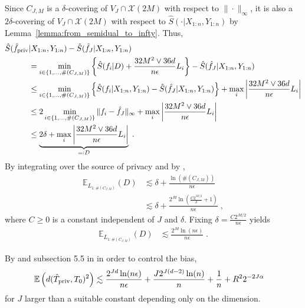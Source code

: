 \documentclass{article}
\theoremstyle{plain}
\theoremstyle{definition}
\theoremstyle{remark}
\newcommand{\E}[0]{\mathbb{E}}
\newcommand{\defeq}{=\vcentcolon}
\newcommand\p[1]{\left( {#1}\right)}
\newcommand\card[1]{\# \left( {#1}\right)}
\begin{document}
Since $C_{J, M}$ is a $\delta$-covering of $V_J \cap \mathcal{X}(2M)$ with respect to $\| \cdot\|_{\infty}$, it is also a $2 \delta$-covering of $V_J \cap \mathcal{X}(2M)$ with respect to $\hat{S}(\cdot | X_{1:n}, Y_{1:n})$ by Lemma~\ref{lemma:from_semidual_to_infty}. 
Thus,
\begin{equation}
    \begin{aligned}
        \hat{S}(\hat{f}_{\text{\normalshape priv}} &| X_{1:n}, Y_{1:n}) - \hat{S}(\hat{f}_{J} | X_{1:n}, Y_{1:n}) \\
        & = \min_{i \in \{1, \dots, \card{C_{J, M}} \}} \left\{\hat{S}(f_i | D) + \frac{32 M^2 \vee 36 d}{n \epsilon} L_i \right\} -
        \hat S(\hat f_J|X_{1:n}, Y_{1:n})\\
        & \leq \min_{i \in \{1, \dots, \card{C_{J, M}} \}} \left\{\hat{S}({f}_{i} | X_{1:n}, Y_{1:n}) - \hat S(\hat f_J|X_{1:n}, Y_{1:n}) \right\} + \max_{i} \left| \frac{32 M^2 \vee 36 d}{n \epsilon} L_i \right|\\
        & \leq 2\min_{i \in \{1, \dots, \card{C_{J, M}} \}} \| f_i - \hat f_J\|_\infty+ \max_{i} \left| \frac{32 M^2 \vee 36 d}{n \epsilon} L_i \right|\\
        &\leq 
        \underbrace{2 \delta + \max_{i} \left| \frac{32 M^2 \vee 36 d}{n \epsilon} L_i \right|}_{\defeq D} \;.
    \end{aligned}
\end{equation}
By integrating over the source of privacy and by ,
\begin{equation}
    \begin{aligned}
        \E_{L_{1:\card{C_{J, M}}}} \p{D}
        &\lesssim 
        \delta + \frac{\ln(\card{C_{J, M}})}{n \epsilon} \\
        &\lesssim 
        \delta + \frac{2^{Jd} \ln \p{\frac{C 2^{J d / 2} }{\delta} + 1}}{n \epsilon} \;,
    \end{aligned}
\end{equation}
where $C\geq 0$ is a constant independent of $J$ and $\delta$. 
Fixing $\delta = \frac{C 2^{J d / 2} }{n \epsilon}$ yields
\begin{equation}
    \begin{aligned}
        \E_{L_{1:\card{C_{J, M}}}} \p{D}
        &\lesssim 
        \frac{2^{Jd} \ln(n \epsilon)}{n \epsilon}  \;.
    \end{aligned}
\end{equation}

By  and subsection 5.5 in \cite{hutter2021minimax} in order to control the bias, 
\begin{equation}
    \begin{aligned}
        \E &\p{d(\hat{T}_{\text{\normalshape priv}}, T_0)^2} 
        \lesssim 
        \frac{2^{Jd} \ln(n \epsilon)}{n \epsilon}  + \frac{J 2^{J (d-2)}\ln(n)}{n}+ \frac{1}{n} + R^2 2^{-2 J \alpha}
    \end{aligned}
    \end{equation}
for $J$ larger than a suitable constant depending only on the dimension.
\end{document}
